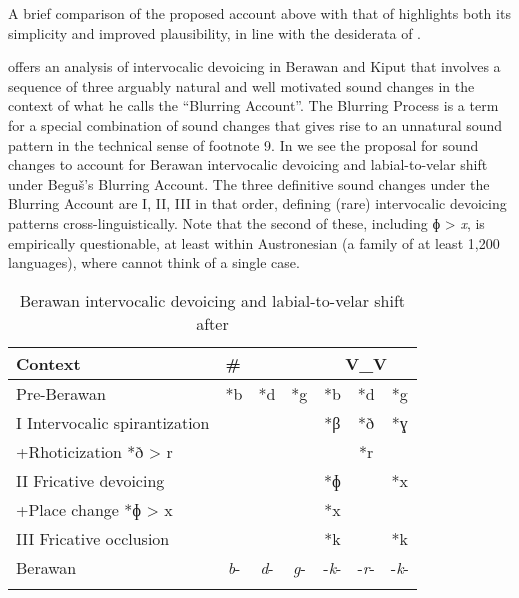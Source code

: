\documentclass[output=paper]{langscibook}
\begin{document}
A brief comparison of the proposed account above with that of \citet{Beguš2019} highlights both its simplicity and improved plausibility, in line with the desiderata of .

\citet{Beguš2019} offers an analysis of intervocalic devoicing in Berawan and Kiput that involves a sequence of three arguably natural and well motivated sound changes in the context of what he calls the “Blurring Account”. The Blurring Process is a term for a special combination of sound changes that gives rise to an unnatural sound pattern in the technical sense of footnote 9. In  we see the proposal for sound changes to account for Berawan intervocalic devoicing and labial-to-velar shift under Beguš’s Blurring Account. The three definitive sound changes under the Blurring Account are I, II, III in that order, defining (rare) intervocalic devoicing patterns cross-linguistically. Note that the second of these, including ɸ > \textit{x}, is empirically questionable, at least within Austronesian (a family of at least 1,200 languages), where  cannot think of a single case.

\begin{table}%
\caption{Berawan intervocalic devoicing and labial-to-velar shift after \citet{Beguš2019}}
\label{tab:ex:blevins:12}
\begin{tabularx}{.8\textwidth}{X c@{~}c@{~}c @{\qquad\qquad} c@{~}c@{~}c}
\lsptoprule
  Context                        &  \multicolumn{3}{l}{\#{\longrule}}  &  \multicolumn{3}{c}{V\_V}\\\midrule
  Pre-Berawan                    &  *b  & *d  & *g    &  *b  & *d  & *g\\\addlinespace
  I Intervocalic spirantization  &      &     &       &  *β  & *ð  & *ɣ\\
  +Rhoticization *ð  > r         &      &     &       &      & *r  &   \\
  II Fricative devoicing         &      &     &       &  *ɸ  &     & *x\\
  +Place change  *ɸ > x          &      &     &       &*x      &     & \\
  III Fricative occlusion        &      &     &       &  *k  &     & *k\\\addlinespace
  Berawan                        &   \textit{b}- &  \textit{d}- &  \textit{g}-   &  -\textit{k}- & -\textit{r}- & -\textit{k}-\\
  \lspbottomrule
\end{tabularx}
\end{table}
\end{document}
